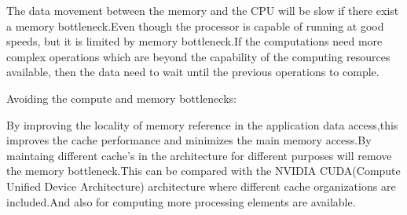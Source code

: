 The data movement between the memory and the CPU will be slow if there exist a memory bottleneck.Even though the processor is capable of running at good speeds, but it is limited by memory bottleneck.If the computations need more complex operations which are beyond the capability of the computing resources available, then the data need to wait until the previous operations to comple.

Avoiding the compute and memory  bottlenecks:

By improving the locality of memory reference in the application data access,this improves the cache performance and minimizes the main memory access.By maintaing different cache's in the architecture for different purposes will remove the memory bottleneck.This can be compared with the NVIDIA CUDA(Compute Unified Device Architecture) architecture where different cache organizations are included.And also for computing more processing elements  are available.
